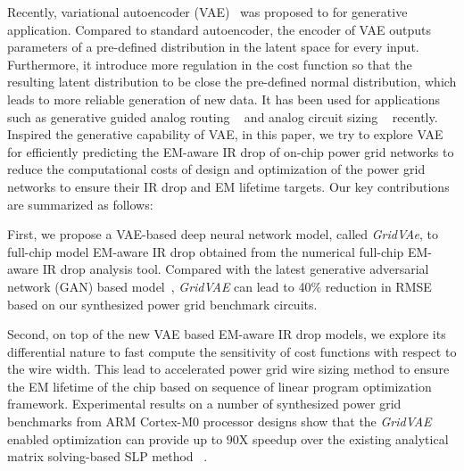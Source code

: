    
Recently, variational autoencoder (VAE)~\cite{Diederik:arxiv'22} was proposed to for generative application. Compared to standard autoencoder, the encoder of VAE outputs parameters of a pre-defined distribution in the latent space for every input. Furthermore, it introduce more regulation in the cost function so that the resulting latent distribution to be close the pre-defined normal distribution, which leads to more reliable generation of new data. It has been used for applications such as generative guided analog routing ~\cite{Zhu:ICCAD'19} and analog circuit sizing ~\cite{Touloupas:SMACD'22} recently.
Inspired the generative capability of VAE, in this paper, we try to explore VAE for efficiently predicting the EM-aware IR drop of on-chip power grid networks to reduce the computational costs of design and optimization of  the power grid networks to ensure their IR drop and EM lifetime targets.  Our key contributions are summarized as follows:

\begin{itemlist}
\item First, we propose a VAE-based deep neural network model, called {\it GridVAe}, to full-chip model EM-aware IR drop obtained from the numerical full-chip EM-aware IR drop analysis tool.  Compared with the latest generative adversarial network (GAN) based model~\cite{ZhouJin:ICCAD'20}, {\it GridVAE} can lead to 40$\%$ reduction in RMSE based on our synthesized power grid benchmark circuits.

\item Second, on top of the new VAE based EM-aware IR drop models, we explore its differential nature to fast compute the sensitivity of cost functions with respect to the wire width. This lead to accelerated power grid wire sizing method to ensure the EM lifetime of the chip based on sequence of linear program optimization framework. Experimental results on a number of synthesized power grid benchmarks from ARM Cortex-M0 processor designs show that the {\it GridVAE} enabled optimization can provide up to $90$X speedup over the existing analytical matrix solving-based SLP method ~\cite{Sukharev:2019pg}.
 
\end{itemlist}

